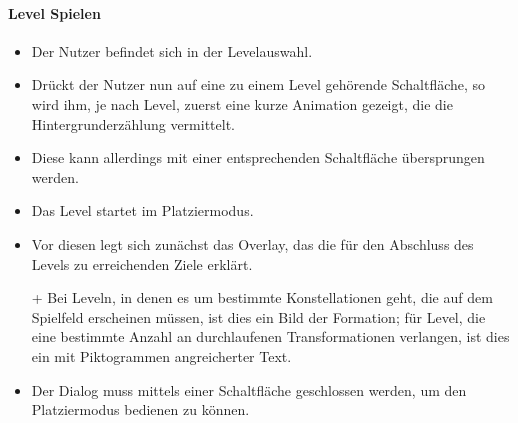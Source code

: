 \paragraph{Level Spielen}\mbox{}\newline
\begin{itemize}
\item Der Nutzer befindet sich in der Levelauswahl.
\item Drückt der Nutzer nun auf eine zu einem
Level gehörende Schaltfläche, so wird ihm, je nach Level, zuerst eine kurze
Animation gezeigt, die die Hintergrunderzählung vermittelt. 
\item Diese kann allerdings mit einer entsprechenden Schaltfläche übersprungen werden.
\item Das Level startet im Platziermodus.
\item Vor diesen legt sich zunächst das Overlay, das die für den Abschluss des Levels zu erreichenden Ziele
erklärt.
\item[+] Bei Leveln, in denen es um bestimmte Konstellationen geht, die auf
dem Spielfeld erscheinen müssen, ist dies ein Bild der Formation; für Level, die eine bestimmte Anzahl an durchlaufenen Transformationen
verlangen, ist dies ein mit Piktogrammen angreicherter Text.
\item Der Dialog muss mittels einer Schaltfläche geschlossen werden, um den
Platziermodus bedienen zu können. 
\end{itemize}


